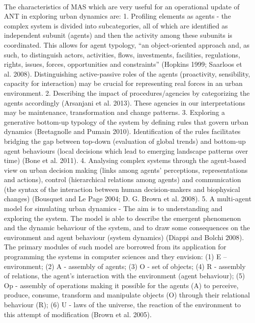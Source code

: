 \documentclass[11pt]{report}
\begin{document}
\\
The characteristics of MAS which are very useful for an operational update of ANT in exploring urban dynamics are:
1.	Profiling elements as agents - the complex system is divided into subcategories, all of which are identified as independent subunit (agents) and then the activity among these subunits is coordinated. This allows for agent typology, “an object-oriented approach and, as such, to distinguish actors, activities, ﬂows, investments, facilities, regulations, rights, issues, forces, opportunities and constraints” (Hopkins 1999; Saarloos et al. 2008). Distinguishing active-passive roles of the agents (proactivity, sensibility, capacity for interaction) may be crucial for representing real forces in an urban environment. 
2.	Describing the impact of procedures/agencies by categorizing the agents accordingly (Arsanjani et al. 2013). These agencies in our interpretations may be maintenance, transformation and change patterns.
3.	Exploring a generative bottom-up typology of the system by defining rules that govern urban dynamics (Bretagnolle and Pumain 2010). Identification of the rules facilitates bridging the gap between top-down (evaluation of global trends) and bottom-up agent behaviours (local decisions which lead to emerging landscape patterns over time) (Bone et al. 2011). 
4.	Analysing complex systems through the agent-based view on urban decision making (links among agents' perceptions, representations and actions), control (hierarchical relations among agents) and communication (the syntax of the interaction between human decision-makers and biophysical changes) (Bousquet and Le Page 2004; D. G. Brown et al. 2008).
5.	A multi-agent model for simulating urban dynamics - The aim is to understanding and exploring the system. The model is able to describe the emergent phenomenon and the dynamic behaviour of the system,  and to draw some consequences on the environment and agent behaviour (system dynamics) (Diappi and Bolchi 2008). The primary modules of such model are borrowed from its application for programming the systems in computer sciences and they envision: (1) E – environment; (2)  A - assembly of agents; (3) O - set of objects; (4) R - assembly of relations, the agent’s interaction with the environment (agent behaviour); (5) Op - assembly of operations making it possible for the agents (A) to perceive, produce, consume, transform and manipulate objects (O) through their relational behaviour (R); (6) U - laws of the universe, the reaction  of  the  environment  to  this  attempt  of  modification (Brown et al. 2005).
\end{document}
